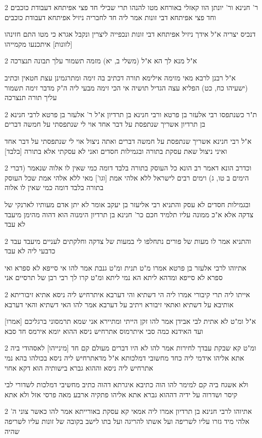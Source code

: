 \documentclass[12pt, openany]{book}
\newcommand{\sethebfont}{
\fontsize{10.5pt}{21.0pt} \selectfont
}
\newcommand{\twocol}[1]{
	{\sethebfont \begin{multicols}{2}
			#1
	\end{multicols}}	
}
\begin{document}
\twocol{ר' חנינא ור' יונתן הוו קאזלי באורחא מטו להנהו תרי שבילי חד פצי אפיתחא דעבודת כוכבים וחד פצי אפיתחא דבי זונות אמר ליה חד לחבריה ניזיל אפיתחא דעבודת כוכבים
\par דנכיס יצריה א"ל אידך ניזיל אפיתחא דבי זונות ונכפייה ליצרין ונקבל אגרא כי מטו התם חזינהו [לזונות] איתכנעו מקמייהו}
\twocol{א"ל מנא לך הא א"ל (משלי ב, יא) מזמה תשמור עלך תבונה תנצרכה
\par א"ל רבנן לרבא מאי מזימה אילימא תורה דכתיב בה זימה ומתרגמינן עצת חטאין וכתיב (ישעיהו כח, כט) הפליא עצה הגדיל תושיה אי הכי זימה מבעי ליה ה"ק מדבר זימה תשמור עליך תורה תנצרכה}
\twocol{ת"ר כשנתפסו רבי אלעזר בן פרטא ורבי חנינא בן תרדיון א"ל ר' אלעזר בן פרטא לרבי חנינא בן תרדיון אשריך שנתפסת על דבר אחד אוי לי שנתפסתי על חמשה דברים
\par א"ל רבי חנינא אשריך שנתפסת על חמשה דברים ואתה ניצול אוי לי שנתפסתי על דבר אחד ואיני ניצול שאת עסקת בתורה ובגמילות חסדים ואני לא עסקתי אלא בתורה [בלבד]}
\twocol{וכדרב הונא דאמר רב הונא כל העוסק בתורה בלבד דומה כמי שאין לו אלוה שנאמר (דברי הימים ב טו, ג) וימים רבים לישראל ללא אלהי אמת [וגו'] מאי ללא אלהי אמת שכל העוסק בתורה בלבד דומה כמי שאין לו אלוה
\par ובגמילות חסדים לא עסק והתניא רבי אליעזר בן יעקב אומר לא יתן אדם מעותיו לארנקי של צדקה אלא א"כ ממונה עליו תלמיד חכם כר' חנינא בן תרדיון הימנוה הוא דהוה מהימן מיעבד לא עבד}
\twocol{והתניא אמר לו מעות של פורים נתחלפו לי במעות של צדקה וחלקתים לעניים מיעבד עבד כדבעי ליה לא עבד
\par אתיוהו לרבי אלעזר בן פרטא אמרו מ"ט תנית ומ"ט גנבת אמר להו אי סייפא לא ספרא ואי ספרא לא סייפא ומדהא ליתא הא נמי ליתא ומ"ט קרו לך רבי רבן של תרסיים אני}
\twocol{אייתו ליה תרי קיבורי אמרו ליה הי דשתיא והי דערבא איתרחיש ליה ניסא אתיא זיבוריתא אותיבא על דשתיא ואתאי זיבורא ויתיב על דערבא אמר להו האי דשתיא והאי דערבא
\par א"ל ומ"ט לא אתית לבי אבידן אמר להו זקן הייתי ומתיירא אני שמא תרמסוני ברגליכם [אמרו] ועד האידנא כמה סבי איתרמוס אתרחיש ניסא ההוא יומא אירמס חד סבא}
\twocol{ומ"ט קא שבקת עבדך לחירות אמר להו לא היו דברים מעולם קם חד [מינייהו] לאסהודי ביה אתא אליהו אידמי ליה כחד מחשובי דמלכותא א"ל מדאתרחיש ליה ניסא בכולהו בהא נמי אתרחיש ליה ניסא וההוא גברא בישותיה הוא דקא אחוי
\par ולא אשגח ביה קם למימר להו הוה כתיבא איגרתא דהוה כתיב מחשיבי דמלכות לשדורי לבי קיסר ושדרוה על ידיה דההוא גברא אתא אליהו פתקיה ארבע מאה פרסי אזל ולא אתא}
\twocol{אתיוהו לרבי חנינא בן תרדיון אמרו ליה אמאי קא עסקת באורייתא אמר להו כאשר צוני ה' אלהי מיד גזרו עליו לשריפה ועל אשתו להריגה ועל בתו לישב בקובה של זונות עליו לשריפה שהיה}
\end{document}
